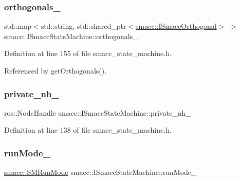 \subsubsection{\texorpdfstring{orthogonals\+\_\+}{orthogonals\_}}
{\footnotesize\ttfamily std\+::map$<$std\+::string, std\+::shared\+\_\+ptr$<$\hyperlink{classsmacc_1_1ISmaccOrthogonal}{smacc\+::\+I\+Smacc\+Orthogonal}$>$ $>$ smacc\+::\+I\+Smacc\+State\+Machine\+::orthogonals\+\_\+\hspace{0.3cm}{\ttfamily [protected]}}



Definition at line 155 of file smacc\+\_\+state\+\_\+machine.\+h.



Referenced by get\+Orthogonals().

\mbox{\label{classsmacc_1_1ISmaccStateMachine_a9c6a5c647ecca6599589c12fdcd53bfc}} 
\subsubsection{\texorpdfstring{private\+\_\+nh\+\_\+}{private\_nh\_}}
{\footnotesize\ttfamily ros\+::\+Node\+Handle smacc\+::\+I\+Smacc\+State\+Machine\+::private\+\_\+nh\+\_\+\hspace{0.3cm}{\ttfamily [protected]}}



Definition at line 138 of file smacc\+\_\+state\+\_\+machine.\+h.

\mbox{\label{classsmacc_1_1ISmaccStateMachine_a9f8cfbf577f7ae7a48b7a328e2e6b589}} 
\subsubsection{\texorpdfstring{run\+Mode\+\_\+}{runMode\_}}
{\footnotesize\ttfamily \hyperlink{namespacesmacc_a3e4f79486ea6ea6342dd3c712d16a4f6}{smacc\+::\+S\+M\+Run\+Mode} smacc\+::\+I\+Smacc\+State\+Machine\+::run\+Mode\+\_\+\hspace{0.3cm}{\ttfamily [private]}}



